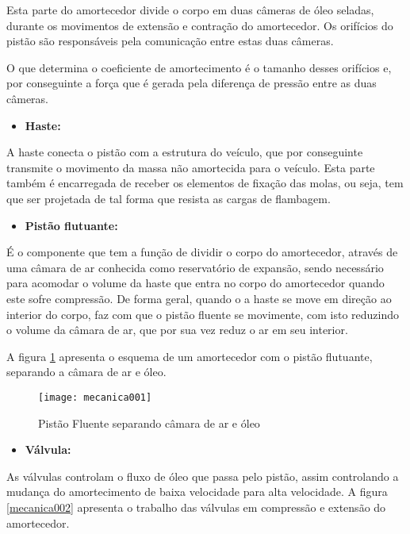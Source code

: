 			Esta parte do amortecedor divide o corpo em duas câmeras de óleo seladas, durante os movimentos de extensão e contração do amortecedor. Os orifícios do pistão são responsáveis pela comunicação entre estas duas câmeras. 


			O que determina o coeficiente de amortecimento é o tamanho desses orifícios e, por conseguinte a força que é gerada pela diferença de pressão entre as duas câmeras. 

		\begin{itemize}
			\item \textbf{Haste:}
		\end{itemize}

			A haste conecta o pistão com a estrutura do veículo, que por conseguinte transmite o movimento da massa não amortecida para o veículo. Esta parte também é encarregada de receber os elementos de fixação das molas, ou seja, tem que ser projetada de tal forma que resista as cargas de flambagem. 

		\begin{itemize}
			\item \textbf{Pistão flutuante:}
		\end{itemize}

			É o componente que tem a função de dividir o corpo do amortecedor, através de uma câmara de ar conhecida como reservatório de expansão, sendo necessário para acomodar o volume da haste que entra no corpo do amortecedor quando este sofre compressão.  De forma geral, quando o a haste se move em direção ao interior do corpo, faz com que o pistão fluente se movimente, com isto reduzindo o volume da câmara de ar, que por sua vez reduz o ar em seu interior. 


			A figura \ref{mecanica001} apresenta o esquema de um amortecedor com o pistão flutuante, separando a câmara de ar e óleo.

			\begin{figure}[h]
				\centering
				\texttt{[image: mecanica001]}
				\caption[Pistão Fluente separando câmara de ar e óleo]{Pistão Fluente separando câmara de ar e óleo \cite{DOliveira}}
				\label{mecanica001}
			\end{figure}

		\begin{itemize}
			\item \textbf{Válvula:}
		\end{itemize}

			As válvulas controlam o fluxo de óleo que passa pelo pistão, assim controlando a mudança do amortecimento de baixa velocidade para alta velocidade. A figura \ref{mecanica002} apresenta o trabalho das válvulas em compressão e extensão do amortecedor.

